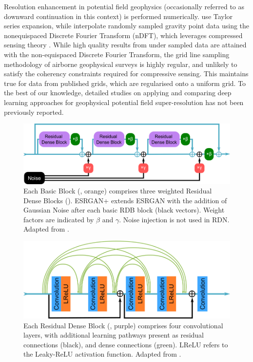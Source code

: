 \documentclass[manuscript.tex]{subfiles}
\begin{document}
Resolution enhancement in potential field geophysics (occasionally referred to as downward continuation in this context) is performed numerically.
\cite{chenPotentialFieldData2022} use Taylor series expansion, while \cite{xuGravityAnomalyReconstruction2019} interpolate randomly sampled gravity point data using the nonequispaced Discrete Fourier Transform (nDFT), which leverages compressed sensing theory \parencite{candesIntroductionCompressiveSampling2008}.
While high quality results from under sampled data are attained with the non-equispaced Discrete Fourier Transform, the grid line sampling methodology of airborne geophysical surveys is highly regular, and unlikely to satisfy the coherency constraints required for compressive sensing.
This maintains true for data from published grids, which are regularised onto a uniform grid.
To the best of our knowledge, detailed studies on applying and comparing deep learning approaches for geophysical potential field super-resolution has not been previously reported.

\begin{figure}[hbt]
    \includegraphics[width=\linewidth]{fig/p1/rdb.png}
    \caption[Basic Blocks]{Each Basic Block (, orange) comprises three weighted Residual Dense Blocks ().
        ESRGAN+ extends ESRGAN with the addition of Gaussian Noise after each basic RDB block (black vectors).
        Weight factors are indicated by \(\beta{}\) and \(\gamma{}\).
        Noise injection is not used in RDN\@.
        Adapted from \cite{rakotonirinaESRGANFurtherImproving2020}.
    }
    \label{fig:rdb}
\end{figure}

\begin{figure}[hbt]
    \includegraphics[width=\linewidth]{fig/p1/convs.png}
    \caption[RDB convolutional layers]{Each Residual Dense Block (, purple) comprises four convolutional layers, with additional learning pathways present as residual connections (black), and dense connections (green). LReLU refers to the Leaky-ReLU activation function. Adapted from \cite{rakotonirinaESRGANFurtherImproving2020}.}
    \label{fig:convs}
\end{figure}
\end{document}
